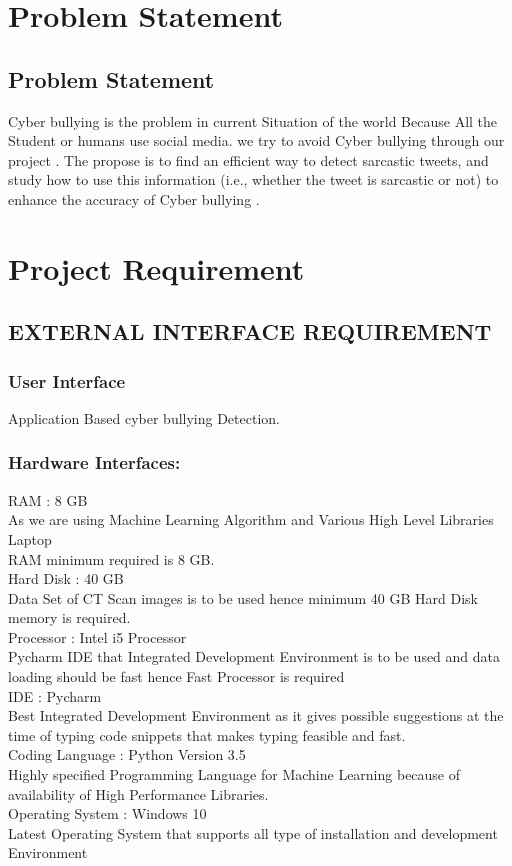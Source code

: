 \documentclass[oneside,a4paper,12pt]{report}
\begin{document}
\chapter{Problem Statement}
\section {Problem Statement}
Cyber bullying is the problem in current Situation of the world Because All  the Student or humans use social media.
we try to avoid Cyber bullying through our project .
The propose is to find an  efficient way to detect sarcastic tweets, and study how to use this information (i.e., whether the tweet is sarcastic or not) to enhance the accuracy of Cyber bullying . 


\chapter{Project Requirement}



\section {EXTERNAL INTERFACE REQUIREMENT}
\subsection {User Interface}
 \item Application Based cyber bullying Detection. 
 
 \subsection {Hardware Interfaces:}
 \item RAM : 8 GB\\
As we are using Machine Learning Algorithm and Various High Level Libraries Laptop\\
RAM minimum required is 8 GB.\\
Hard Disk : 40 GB\\
Data Set of CT Scan images is to be used hence minimum 40 GB Hard Disk memory is required.\\
Processor : Intel i5 Processor\\
Pycharm IDE that Integrated Development Environment is to be used and data loading should be fast hence Fast Processor is required\\
IDE : Pycharm\\
Best Integrated Development Environment as it gives possible suggestions at the time of typing code snippets that makes typing feasible and fast.\\
Coding Language : Python Version 3.5\\
Highly specified Programming Language for Machine Learning because of availability of High Performance Libraries.\\
Operating System : Windows 10\\
Latest Operating System that supports all type of installation and development Environment\\
\end{document}
